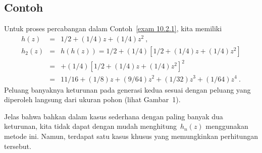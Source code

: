\subsection*{Contoh}

\begin{example}\label{exam 10.2.3.5}
Untuk proses percabangan dalam Contoh~\ref{exam 10.2.1}, kita memiliki
\begin{eqnarray*}
  h(z) &=& 1/2 + (1/4)z + (1/4)z^2\ , \\
h_2(z) &=& h(h(z)) = 1/2 + (1/4)[1/2 + (1/4)z + (1/4)z^2] \\
       &=& + (1/4)[1/2 + (1/4)z + (1/4)z^2]^2 \\
       &=& 11/16 + (1/8)z + (9/64)z^2 + (1/32)z^3 + (1/64)z^4\ .
\end{eqnarray*}
Peluang banyaknya keturunan pada generasi kedua sesuai
dengan peluang yang diperoleh langsung dari ukuran pohon (lihat Gambar~1).
\end{example}

Jelas bahwa bahkan dalam kasus sederhana dengan paling banyak dua keturunan, kita tidak dapat
dengan mudah menghitung~$h_n(z)$ menggunakan metode ini.  Namun, terdapat
satu kasus khusus yang memungkinkan perhitungan tersebut.

